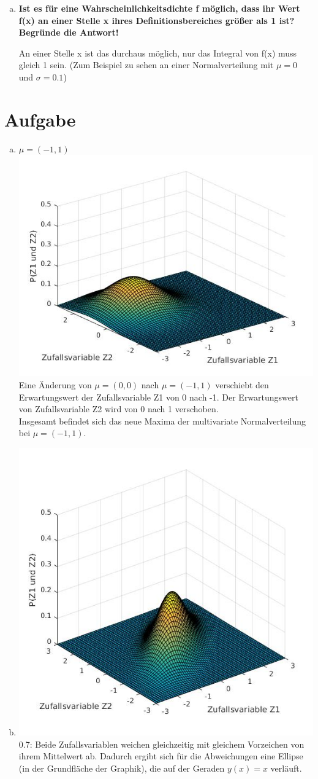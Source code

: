 \documentclass[a4paper]{scrartcl}
\begin{document}
\begin{enumerate}[a)]
	
	\item \textbf{Ist es für eine Wahrscheinlichkeitsdichte f möglich, dass ihr Wert f(x) an einer Stelle x ihres Definitionsbereiches größer als 1 ist? Begründe die Antwort!}
	
	An einer Stelle x ist das durchaus möglich, nur das Integral von f(x) muss gleich 1 sein. (Zum Beispiel zu sehen an einer Normalverteilung mit $\mu = 0$ und $\sigma = 0.1$)
	
\end{enumerate}

\section{Aufgabe}

\begin{enumerate}[a)]
	\item $\mu= (-1,1)$\\
	\includegraphics[width=.6\textwidth]{plots/3a_mu_1_1.jpg}\\
	Eine Änderung von $\mu=(0,0)$ nach $\mu=(-1,1)$ verschiebt den Erwartungswert der Zufallsvariable Z1 von 0 nach -1. Der Erwartungswert von Zufallsvariable Z2 wird von 0 nach 1 verschoben.\\
	Insgesamt befindet sich das neue Maxima der multivariate Normalverteilung bei $\mu=(-1,1)$.\\
	
	\item 
	\includegraphics[width=.6\textwidth]{plots/3b_cov07.jpg}\\
	0.7: Beide Zufallsvariablen weichen gleichzeitig mit gleichem Vorzeichen von ihrem Mittelwert ab. Dadurch ergibt sich für die Abweichungen eine Ellipse (in der Grundfläche der Graphik), die auf der Geraden $y(x)=x$ verläuft.\\
	

\end{enumerate}
\end{document}

